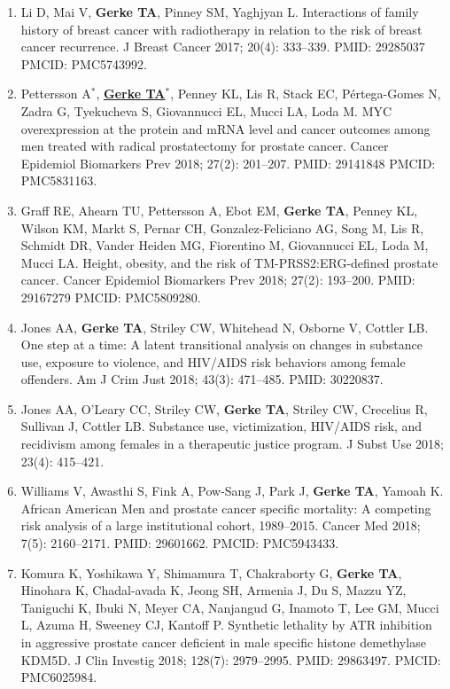 \documentclass[11pt, a4paper]{article} %
\begin{document}
\begin{enumerate}[leftmargin=*]
\item{} Li D, Mai V, {\bf Gerke TA}, Pinney SM, Yaghjyan L. Interactions of family history of breast cancer with radiotherapy in relation to the risk of breast cancer recurrence. J Breast Cancer 2017; 20(4): 333--339. PMID: 29285037 PMCID: PMC5743992. 

\item{} Pettersson A$^*$, \underline{{\bf Gerke TA$^*$}}, Penney KL, Lis R, Stack EC, P\'{e}rtega-Gomes N, Zadra G, Tyekucheva S, Giovannucci EL, Mucci LA, Loda M. MYC overexpression at the protein and mRNA level and cancer outcomes among men treated with radical prostatectomy for prostate cancer. Cancer Epidemiol Biomarkers Prev 2018; 27(2): 201--207. PMID: 29141848 PMCID: PMC5831163.

\item{} Graff RE, Ahearn TU, Pettersson A, Ebot EM, {\bf Gerke TA}, Penney KL, Wilson KM, Markt S, Pernar CH, Gonzalez-Feliciano AG, Song M, Lis R, Schmidt DR, Vander Heiden MG, Fiorentino M, Giovannucci EL, Loda M, Mucci LA. Height, obesity, and the risk of TM-PRSS2:ERG-defined prostate cancer. Cancer Epidemiol Biomarkers Prev 2018; 27(2): 193--200. PMID: 29167279 PMCID: PMC5809280.

\item{} Jones AA, {\bf Gerke TA}, Striley CW, Whitehead N, Osborne V, Cottler LB. One step at a time: A latent transitional analysis on changes in substance use, exposure to violence, and HIV/AIDS risk behaviors among female offenders. Am J Crim Just 2018; 43(3): 471--485. PMID: 30220837.

\item{} Jones AA, O'Leary CC, Striley CW, {\bf Gerke TA}, Striley CW, Crecelius R, Sullivan J, Cottler LB. Substance use, victimization, HIV/AIDS risk, and recidivism among females in a therapeutic justice program. J Subst Use 2018; 23(4): 415--421.

\item{} Williams V, Awasthi S, Fink A, Pow-Sang J, Park J, {\bf Gerke TA}, Yamoah K. African American Men and prostate cancer specific mortality: A competing risk analysis of a large institutional cohort, 1989--2015. Cancer Med 2018; 7(5): 2160--2171. PMID: 29601662. PMCID: PMC5943433.

\item{} Komura K, Yoshikawa Y, Shimamura T, Chakraborty G, {\bf Gerke TA}, Hinohara K, Chadal-avada K, Jeong SH,  Armenia J, Du S, Mazzu YZ, Taniguchi K, Ibuki N, Meyer CA, Nanjangud G, Inamoto T, Lee GM, Mucci L, Azuma H, Sweeney CJ, Kantoff P. Synthetic lethality by ATR inhibition in aggressive prostate cancer deficient in male specific histone demethylase KDM5D. J Clin Investig 2018; 128(7): 2979--2995. PMID: 29863497. PMCID: PMC6025984.


\end{enumerate}
\end{document}
